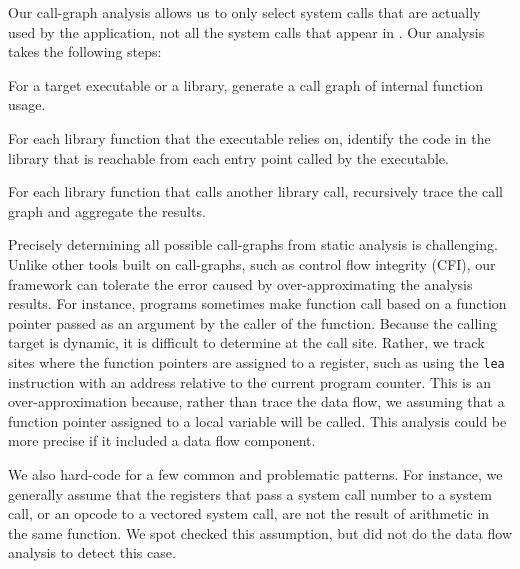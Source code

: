 Our call-graph analysis allows us to only select system calls that are actually used by the application, not all the system calls that appear in \libc{}.
Our analysis takes the following steps:
\begin{compactitem}
\item For a target executable or a library, generate a call graph of internal function usage.
\item For each library function that the executable relies on, identify the code in the library that is reachable from each entry point called by the executable.
\item For each library function that calls another library call, recursively trace the call graph and aggregate the results. 
\end{compactitem}
\vspace{10pt}

Precisely determining all possible call-graphs from static analysis is challenging.
Unlike other tools built on 
call-graphs, such as control flow integrity (CFI), our framework can tolerate the error caused by over-approximating the analysis results.
For instance, 
programs sometimes make function call based on a function pointer passed as an argument by the caller of the function. 
Because the calling target is dynamic, it is difficult to determine at the  call site.
Rather, we track sites where the function pointers are assigned to a register, such as using the {\tt lea} instruction with an address
relative to the current program counter.
This is an over-approximation because, rather than trace the data flow, we assuming that a function pointer assigned to a local variable will be called.
This analysis could be more precise if it included a data flow component. 

We also hard-code for a few common and problematic patterns.
For instance, we generally assume that the registers that pass a system call number to a system call,
or an opcode to a vectored system call, are not the result of arithmetic in the same function.
We spot checked this assumption, but did not do the data flow analysis to detect this case.

